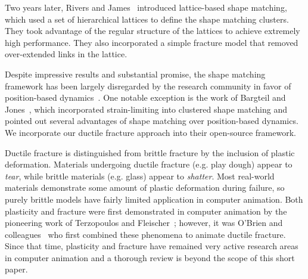\documentclass[review]{acmsiggraph}
\begin{document}
Two years later, Rivers and James~ introduced lattice-based shape matching,
which used a set of hierarchical lattices to define the shape matching clusters.  They took advantage
of the regular structure of the lattices to achieve extremely high performance.  They also incorporated a 
simple fracture model that removed over-extended links in the lattice.  


Despite impressive results and substantial promise,
the shape matching framework has been largely disregarded by the research community in favor of position-based
dynamics~\cite{Mueller:2007:PBD,Bender:2013:PBM,Bender:2014:ASO,Macklin:2014:UPP}.  One notable exception is
the work of Bargteil and Jones~, which incorporated strain-limiting into clustered shape matching
and pointed out several advantages of shape matching over position-based dynamics.
We incorporate our ductile fracture approach into their open-source framework.

Ductile fracture is distinguished from brittle fracture by the inclusion of plastic deformation.  Materials undergoing ductile
fracture (e.g. play dough) appear to {\em tear}, while brittle materials (e.g. glass) appear to {\em shatter}.  Most
real-world materials demonstrate some amount of plastic deformation during failure, so purely brittle models have fairly limited
application in computer animation.  
Both plasticity and fracture
were first demonstrated in computer animation by the pioneering work of Terzopoulos and Fleischer~; 
however, it was O'Brien and colleagues~
who first combined these phenomena to animate ductile fracture.  Since that time, plasticity and fracture have
remained very active research areas in computer animation and a thorough review is beyond the scope of this short paper.
\end{document}

